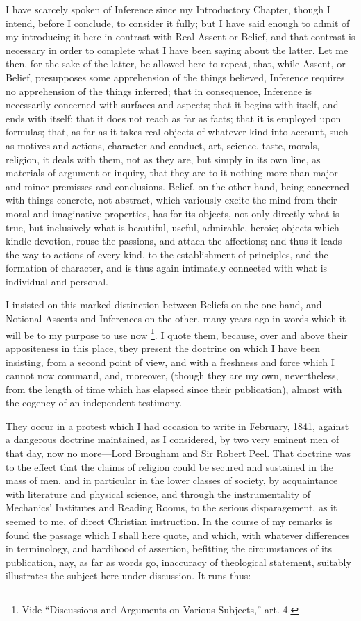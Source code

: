 I have scarcely spoken of Inference since my Introductory Chapter,
though I intend, before I conclude, to consider it fully; but I have
said enough to admit of my introducing it here in contrast with Real
Assent or Belief, and that contrast is necessary in order to complete
what I have been saying about the latter. Let me then, for the sake of
the latter, be allowed here to repeat, that, while Assent, or Belief,
presupposes some apprehension of the things believed, Inference
requires no apprehension of the things inferred; that in consequence,
Inference is necessarily concerned with surfaces and aspects; that it
begins with itself, and ends with itself; that it does not reach as
far as facts; that it is employed upon formulas; that, as far as it
takes real objects of whatever kind into account, such as motives and
actions, character and conduct, art, science, taste, morals, religion,
it deals with them, not as they are, but simply in its own line, as
materials of argument or inquiry, that they are to it nothing more
than major and minor premisses and conclusions. Belief, on the other
hand, being concerned with things concrete, not abstract, which
variously excite the mind from their moral and imaginative properties,
has for its objects, not only directly what is true, but inclusively
what is beautiful, useful, admirable, heroic; objects which kindle
devotion, rouse the passions, and attach the affections; and thus it
leads the way to actions of every kind, to the establishment of
principles, and the formation of character, and is thus again
intimately connected with what is individual and personal.

I insisted on this marked distinction between Beliefs on the one
hand, and Notional Assents and Inferences on the other, many years ago
in words which it will be to my purpose to use now \footnote{Vide ``Discussions and Arguments on Various Subjects,''
art. 4.}.
I quote them, because, over and above their appositeness in this
place, they present the doctrine on which I have been insisting, from
a second point of view, and with a freshness and force which I cannot
now command, and, moreover, (though they are my own, nevertheless,
from the length of time which has elapsed since their publication),
almost with the cogency of an independent testimony.

They occur in a protest which I had occasion to write in February,
1841, against a dangerous doctrine maintained, as I considered, by two
very eminent men of that day, now no more—Lord Brougham and Sir
Robert Peel. That doctrine was to the effect that the claims of
religion could be secured and sustained in the mass of men, and in
particular in the lower classes of society, by acquaintance with
literature and physical science, and through the instrumentality of
Mechanics' Institutes and Reading Rooms, to the serious
disparagement, as it seemed to me, of direct Christian instruction. In
the course of my remarks is found the passage which I shall here
quote, and which, with whatever differences in terminology, and
hardihood of assertion, befitting the circumstances of its
publication, nay, as far as words go, inaccuracy of theological
statement, suitably illustrates the subject here under discussion. It
runs thus:—

